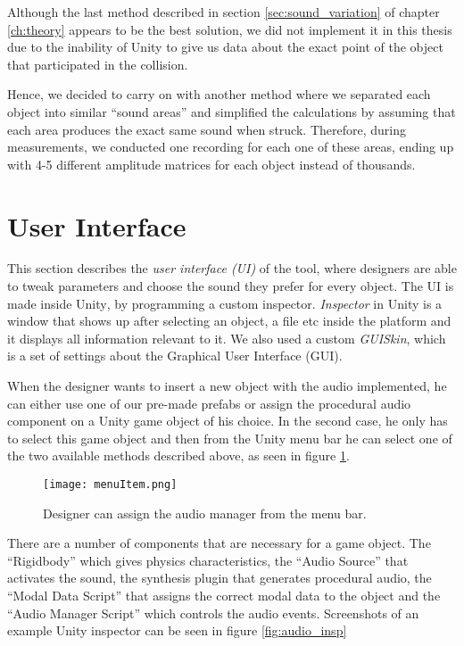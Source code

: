 Although the last method described in section \ref{sec:sound_variation} of chapter \ref{ch:theory} appears to be the best solution, we did not implement it in this thesis due to the inability of Unity\textsuperscript{\textregistered} to give us data about the exact point of the object that participated in the collision.

Hence, we decided to carry on with another method where we separated each object into similar ``sound areas'' and simplified the calculations by assuming that each area produces the exact same sound when struck. Therefore, during measurements, we conducted one recording for each one of these areas, ending up with 4-5 different amplitude matrices for each object instead of thousands.

\section{User Interface}\label{sec:UI}
This section describes the \textit{user interface (UI)} of the tool, where designers are able to tweak parameters and choose the sound they prefer for every object. The UI is made inside Unity\textsuperscript{\textregistered}, by programming a custom inspector. \textit{Inspector} in Unity\textsuperscript{\textregistered} is a window that shows up after selecting an object, a file etc inside the platform and it displays all information relevant to it. We also used a custom \textit{GUISkin}, which is a set of settings about the Graphical User Interface (GUI). 

When the designer wants to insert a new object with the audio implemented, he can either use one of our pre-made prefabs or assign the procedural audio component on a Unity\textsuperscript{\textregistered} game object of his choice. In the second case, he only has to select this game object and then from the Unity\textsuperscript{\textregistered} menu bar he can select one of the two available methods described above, as seen in figure \ref{fig:menu_item}.

\begin{figure}[H]
  \centering
    \texttt{[image: menuItem.png]}
      \caption{Designer can assign the audio manager from the menu bar.}
      \label{fig:menu_item}
\end{figure}

There are a number of components that are necessary for a game object. The ``Rigidbody'' which gives physics characteristics, the ``Audio Source'' that activates the sound, the synthesis plugin that generates procedural audio, the ``Modal Data Script'' that assigns the correct modal data to the object and the ``Audio Manager Script'' which controls the audio events. Screenshots of an example Unity\textsuperscript{\textregistered} inspector can be seen in figure \ref{fig:audio_insp} 

